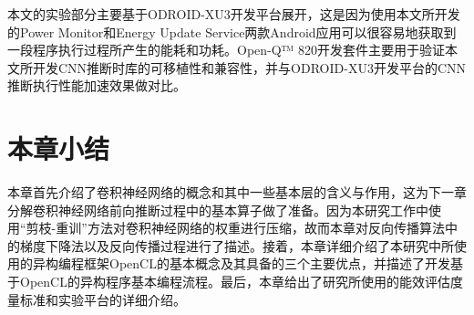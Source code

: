 本文的实验部分主要基于ODROID-XU3开发平台展开，这是因为使用本文所开发的Power Monitor和Energy Update Service两款Android应用可以很容易地获取到一段程序执行过程所产生的能耗和功耗。Open-Q™ 820开发套件主要用于验证本文所开发CNN推断时库的可移植性和兼容性，并与ODROID-XU3开发平台的CNN推断执行性能加速效果做对比。

\section{本章小结}

本章首先介绍了卷积神经网络的概念和其中一些基本层的含义与作用，这为下一章分解卷积神经网络前向推断过程中的基本算子做了准备。因为本研究工作中使用“剪枝-重训”方法对卷积神经网络的权重进行压缩，故而本章对反向传播算法中的梯度下降法以及反向传播过程进行了描述。接着，本章详细介绍了本研究中所使用的异构编程框架OpenCL的基本概念及其具备的三个主要优点，并描述了开发基于OpenCL的异构程序基本编程流程。最后，本章给出了研究所使用的能效评估度量标准和实验平台的详细介绍。

\cleardoublepage 